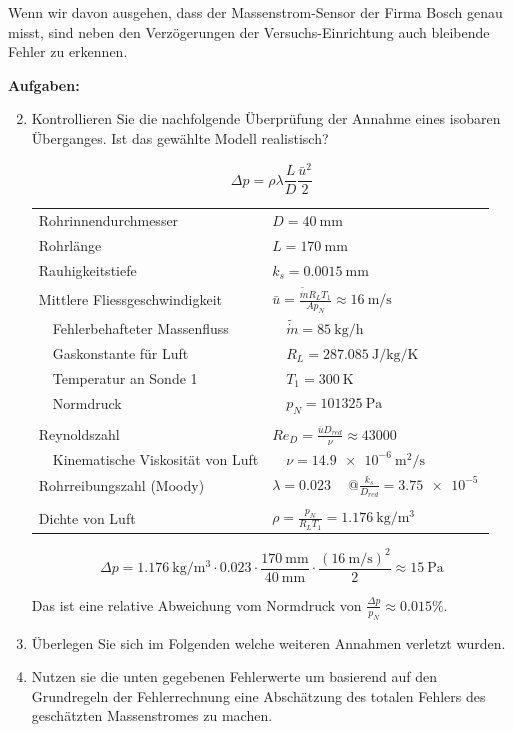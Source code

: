 \documentclass[a4paper,10pt,oneside]{article}
\begin{document}
Wenn wir davon ausgehen, dass der Massenstrom-Sensor der Firma Bosch genau misst, sind neben den Verzögerungen der Versuchs-Einrichtung auch bleibende Fehler zu erkennen.


\textbf{Aufgaben:}
\begin{enumerate}
\setcounter{enumi}{1}
\item Kontrollieren Sie die nachfolgende Überprüfung der Annahme eines isobaren Überganges. Ist das gewählte Modell realistisch?

\begin{equation}
\Delta p=\rho\lambda\frac{L}{D}\frac{\bar{u}^2}{2}
\end{equation}

\begin{tabular}{l@{$\quad$}l}
Rohrinnendurchmesser&$D = \SI{40}{\milli\meter}$\\
Rohrlänge&$L=\SI{170}{\milli\meter}$\\
Rauhigkeitstiefe&$k_s=\SI{0.0015}{\milli\meter}$\\
Mittlere Fliessgeschwindigkeit&$\bar{u}=\frac{\tilde{\dot{m}} R_L T_1}{A p_N}\approx\SI{16}{\meter\per\second}$\\
$\quad$Fehlerbehafteter Massenfluss&$\quad\tilde{\dot{m}}=\SI{85}{\kilo\gram\per\hour}$\\
$\quad$Gaskonstante für Luft&$\quad R_L=\SI{287.085}{\joule\per\kilo\gram\per\kelvin}$\\
$\quad$Temperatur an Sonde 1&$\quad T_1=\SI{300}{\kelvin}$\\
$\quad$Normdruck&$\quad p_N=\SI{101325}{\pascal}$\\
\\
Reynoldszahl&$Re_D=\frac{\bar{u}D_{red}}{\nu}\approx\SI{43000}{}$\\
$\quad$Kinematische Viskosität von Luft&$\quad\nu=\SI{14.9e-6}{\meter\squared\per\second}$\\
Rohrreibungszahl (Moody)&$\lambda=\SI{0.023}{}\quad @\frac{k_s}{D_{red}}=\SI{3.75e-5}{}$\\
\\
Dichte von Luft&$\rho=\frac{p_N}{R_LT_1}=\SI{1.176}{\kilo\gram\per\meter\cubed}$
\end{tabular}

\vspace{1.5ex}

\[\Delta p=\SI{1.176}{\kilo\gram\per\meter\cubed}\cdot 0.023\cdot\frac{\SI{170}{\milli\meter}}{\SI{40}{\milli\meter}}\cdot\frac{(\SI{16}{\meter\per\second})^2}{2}\approx\SI{15}{\pascal}\]

Das ist eine relative Abweichung vom Normdruck von $\frac{\Delta p}{p_N}\approx 0.015\%$.

\item Überlegen Sie sich im Folgenden welche weiteren Annahmen verletzt wurden.
\item Nutzen sie die unten gegebenen Fehlerwerte um basierend auf den Grundregeln der Fehlerrechnung eine Abschätzung des totalen Fehlers des geschätzten Massenstromes zu machen.
\end{enumerate}
\end{document}

